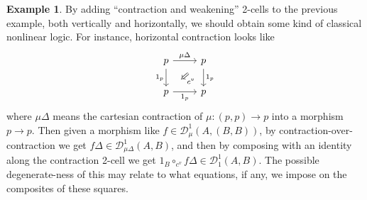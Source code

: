 \documentclass{article}
\theoremstyle{definition}
\newtheorem{eg}{Example}
\def\DD#1#2{\mathcal{D}^{#1}_{#2}}
\begin{document}
\begin{eg}
  By adding ``contraction and weakening'' 2-cells to the previous example, both vertically and horizontally, we should obtain some kind of classical nonlinear logic.
  For instance, horizontal contraction looks like
  \[\begin{tikzcd}
    p \ar[r,"\mu \Delta"] \ar[d,swap,"1_p"]
    \ar[from=r,to=d,phantom,""{name=1,near start},""{name=2,near end}]
    \ar[Rightarrow,from=1,to=2,"c^v"]
    & p \ar[d,"1_p"]
    \\ p \ar[r,swap,"1_p"] & p
  \end{tikzcd}\]
  where $\mu\Delta$ means the cartesian contraction of $\mu:(p,p)\to p$ into a morphism $p\to p$.
  Then given a morphism like $f\in \DD{1}{\mu}(A,(B,B))$, by contraction-over-contraction we get $f\Delta \in \DD{1}{\mu\Delta}(A,B)$, and then by composing with an identity along the contraction 2-cell we get $1_B \circ_{c^v} f\Delta \in \DD{1}{1}(A,B)$.
  The possible degenerate-ness of this may relate to what equations, if any, we impose on the composites of these squares.
\end{eg}
\end{document}
